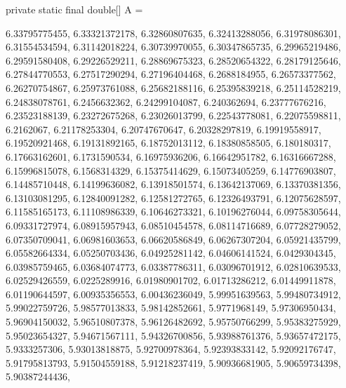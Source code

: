 \begin{code}\begin{hide}
    private static final double[] A = {

     6.33795775455,     6.33321372178,     6.32860807635,
     6.32413288056,     6.31978086301,     6.31554534594,
     6.31142018224,     6.30739970055,     6.30347865735,
     6.29965219486,     6.29591580408,     6.29226529211,
     6.28869675323,     6.28520654322,     6.28179125646,
     6.27844770553,     6.27517290294,     6.27196404468,
      6.2688184955,     6.26573377562,     6.26270754867,
     6.25973761088,     6.25682188116,     6.25395839218,
     6.25114528219,     6.24838078761,      6.2456632362,
     6.24299104087,       6.240362694,     6.23777676216,
     6.23523188139,     6.23272675268,     6.23026013799,
     6.22543778081,     6.22075598811,         6.2162067,
     6.21178253304,     6.20747670647,     6.20328297819,
     6.19919558917,     6.19520921468,     6.19131892165,
     6.18752013112,     6.18380858505,       6.180180317,
     6.17663162601,      6.1731590534,     6.16975936206,
     6.16642951782,     6.16316667288,     6.15996815078,
      6.1568314329,     6.15375414629,     6.15073405259,
     6.14776903807,     6.14485710448,     6.14199636082,
     6.13918501574,     6.13642137069,     6.13370381356,
     6.13103081295,     6.12840091282,     6.12581272765,
     6.12326493791,     6.12075628597,     6.11585165173,
     6.11108986339,     6.10646273321,     6.10196276044,
     6.09758305644,     6.09331727974,     6.08915957943,
     6.08510454578,     6.08114716689,     6.07728279052,
     6.07350709041,     6.06981603653,     6.06620586849,
     6.06267307204,     6.05921435799,     6.05582664334,
     6.05250703436,     6.04925281142,     6.04606141524,
      6.0429304345,     6.03985759465,     6.03684074773,
     6.03387786311,     6.03096701912,     6.02810639533,
     6.02529426559,      6.0225289916,     6.01980901702,
     6.01713286212,     6.01449911878,     6.01190644597,
     6.00935356553,     6.00436236049,     5.99951639563,
     5.99480734912,     5.99022759726,     5.98577013833,
     5.98142852661,      5.9771968149,     5.97306950434,
     5.96904150032,     5.96510807378,     5.96126482692,
     5.95750766299,     5.95383275929,     5.95023654327,
     5.94671567111,     5.94326700856,     5.93988761376,
     5.93657472175,      5.9333257306,     5.93013818875,
     5.92700978364,     5.92393833142,     5.92092176747,
     5.91795813793,     5.91504559188,     5.91218237419,
     5.90936681905,     5.90659734398,     5.90387244436,
}
\end{hide}
\end{code}
